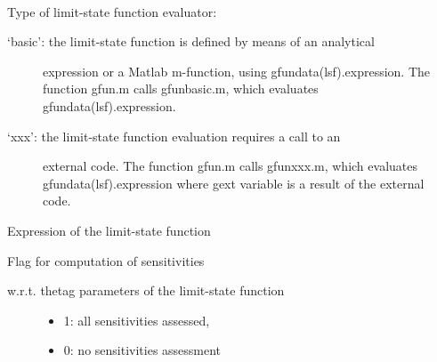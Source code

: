 \documentclass[letterpaper,10pt,english]{sphinxmanual}
\begin{document}
\begin{fulllineitems}
\label{model:pyre.model.LimitState}~

\begin{fulllineitems}
\label{model:pyre.model.LimitState.evaluator}
Type of limit-state function evaluator:
\begin{description}
\item[{`basic': the limit-state function is defined by means of an analytical}] \leavevmode
expression or a Matlab m-function, using
gfundata(lsf).expression. The function gfun.m calls gfunbasic.m,
which evaluates gfundata(lsf).expression.

\item[{`xxx':   the limit-state function evaluation requires a call to an}] \leavevmode
external code.  The function gfun.m calls gfunxxx.m, which
evaluates gfundata(lsf).expression where gext variable is a
result of the external code.

\end{description}

\end{fulllineitems}


\begin{fulllineitems}
\label{model:pyre.model.LimitState.expression}
Expression of the limit-state function

\end{fulllineitems}


\begin{fulllineitems}
\label{model:pyre.model.LimitState.flag_sens}
Flag for computation of sensitivities
\begin{description}
\item[{w.r.t. thetag parameters of the limit-state function}] \leavevmode\begin{itemize}
\item {} 
1: all sensitivities assessed,

\item {} 
0: no sensitivities assessment

\end{itemize}

\end{description}

\end{fulllineitems}


\end{fulllineitems}
\end{document}
